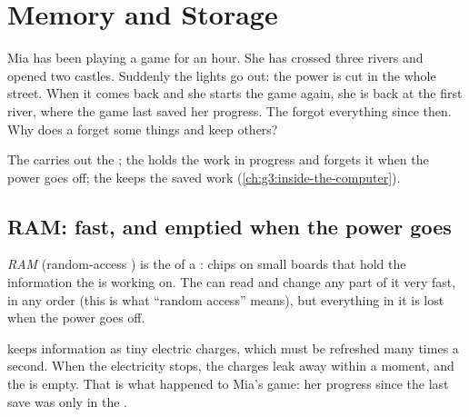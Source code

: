 \chapter{Memory and Storage}\label{ch:g4:memory-and-storage}

Mia has been playing a game for an hour. She has crossed three rivers and
opened two castles. Suddenly the lights go out: the power is cut in the whole
street. When it comes back and she starts the game again, she is back at the
first river, where the game last saved her progress. The  forgot
everything since then. Why does a  forget some things and keep others?

\begin{recall}
The  carries out the ; the  holds the work in
progress and forgets it when the power goes off; the  keeps the saved
work (\cref{ch:g3:inside-the-computer}).
\end{recall}

\section{RAM: fast, and emptied when the power goes}

\begin{definition}[RAM]\label{def:g4:memory-and-storage:ram}
\emph{RAM} (random-access ) is the  of a : chips on small boards
that hold the information the  is working on. The  can read
and change any part of it very fast, in any order (this is what ``random access'' means), but everything in it is lost when the
power goes off.
\end{definition}

 keeps information as tiny electric charges, which must be refreshed many
times a second. When the electricity stops, the charges leak away within a
moment, and the  is empty. That is what happened to Mia's game: her progress
since the last save was only in the .

